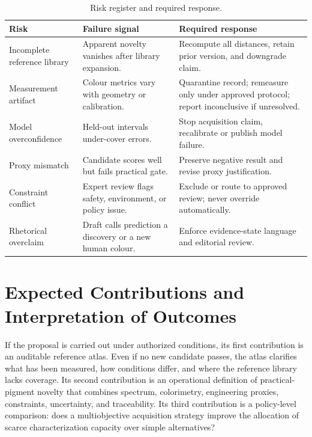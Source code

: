 \documentclass[conference]{IEEEtran}
\newcommand{\practicalnovelty}{practical-pigment novelty}
\begin{document}
\begin{table}[!t]
\caption{Risk register and required response.}
\label{tab:risks}
\centering
\renewcommand{\arraystretch}{1.18}
\begin{tabular}{|P{0.20\columnwidth}|P{0.19\columnwidth}|P{0.28\columnwidth}|}
\hline
\textbf{Risk} & \textbf{Failure signal} & \textbf{Required response} \\
\hline
Incomplete reference library & Apparent novelty vanishes after library expansion. & Recompute all distances, retain prior version, and downgrade claim. \\
\hline
Measurement artifact & Colour metrics vary with geometry or calibration. & Quarantine record; remeasure only under approved protocol; report inconclusive if unresolved. \\
\hline
Model overconfidence & Held-out intervals under-cover errors. & Stop acquisition claim, recalibrate or publish model failure. \\
\hline
Proxy mismatch & Candidate scores well but fails practical gate. & Preserve negative result and revise proxy justification. \\
\hline
Constraint conflict & Expert review flags safety, environment, or policy issue. & Exclude or route to approved review; never override automatically. \\
\hline
Rhetorical overclaim & Draft calls prediction a discovery or a new human colour. & Enforce evidence-state language and editorial review. \\
\hline
\end{tabular}
\end{table}

\section{Expected Contributions and Interpretation of Outcomes}

If the proposal is carried out under authorized conditions, its first contribution is an auditable reference atlas. Even if no new candidate passes, the atlas clarifies what has been measured, how conditions differ, and where the reference library lacks coverage. Its second contribution is an operational definition of \practicalnovelty{} that combines spectrum, colorimetry, engineering proxies, constraints, uncertainty, and traceability. Its third contribution is a policy-level comparison: does a multiobjective acquisition strategy improve the allocation of scarce characterization capacity over simple alternatives?
\end{document}
